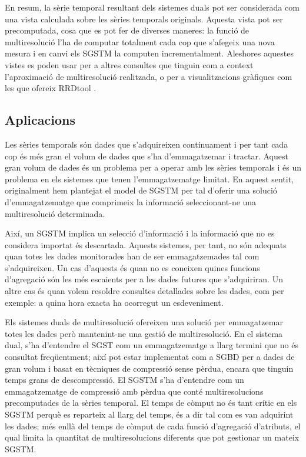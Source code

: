 En resum, la sèrie temporal resultant dels sistemes duals pot ser
considerada com una vista calculada sobre les sèries temporals
originals. Aquesta vista pot ser precomputada, cosa que es pot fer de
diverses maneres: la funció de multiresolució l'ha de computar
totalment cada cop que s'afegeix una nova mesura i en canvi els
\gls{SGSTM} la computen incrementalment.  Aleshores aquestes vistes es
poden usar per a altres consultes que tinguin com a context
l'aproximació de multiresolució realitzada, o per a visualitzacions
gràfiques com les que ofereix RRDtool \cite{rrdtool}.











\subsection{Aplicacions}


Les sèries temporals són dades que s'adquireixen contínuament i per
tant cada cop és més gran el volum de dades que s'ha d'emmagatzemar i
tractar. Aquest gran volum de dades és un problema per a operar amb
les sèries temporals i és un problema en els sistemes que tenen
l'emmagatzematge limitat. En aquest sentit, originalment hem
plantejat el model de \gls{SGSTM} per tal d'oferir una solució
d'emmagatzematge que comprimeix la informació seleccionant-ne una
multiresolució determinada.


Així, un \gls{SGSTM} implica un selecció d'informació i la informació
que no es considera importat és descartada. Aquests sistemes, per
tant, no són adequats quan totes les dades monitorades han de ser
emmagatzemades tal com s'adquireixen. Un cas d'aquests és quan no es
coneixen quines funcions d'agregació són les més escaients per a les
dades futures que s'adquiriran. Un altre cas és quan volem resoldre
consultes detallades sobre les dades, com per exemple: a quina hora
exacta ha ocorregut un esdeveniment.


Els sistemes duals de multiresolució ofereixen una solució per
emmagatzemar totes les dades però mantenint-ne una gestió de
multiresolució.  En el sistema dual, s'ha d'entendre el \gls{SGST} com
un emmagatzematge a llarg termini que no és consultat freqüentment;
així pot estar implementat com a \gls{SGBD} per a dades de gran volum
i basat en tècniques de compressió sense pèrdua, encara que tinguin
temps grans de descompressió. El \gls{SGSTM} s'ha d'entendre com un
emmagatzematge de compressió amb pèrdua que conté multiresolucions
precomputades de la sèries temporal.  El temps de còmput no és tant
crític en els \gls{SGSTM} perquè es reparteix al llarg del temps, és a
dir tal com es van adquirint les dades; més enllà del temps de còmput
de cada funció d'agregació d'atributs, el qual limita la quantitat de
multiresolucions diferents que pot gestionar un mateix \gls{SGSTM}.


